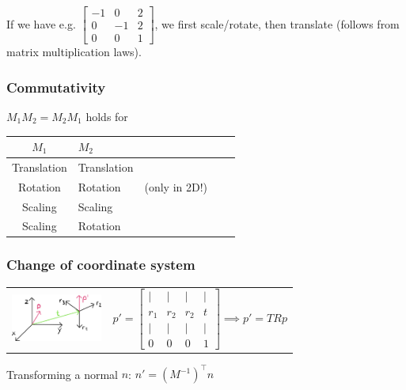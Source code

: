 \documentclass[a4paper,10pt]{article}
\renewcommand*{\arraystretch}{2}
\begin{document}
\egroup
If we have e.g. \(  \left[\begin{smallmatrix} -1 & 0 & 2 \\ 0 & -1 & 2 \\ 0 & 0 & 1 \end{smallmatrix}\right] \), we first scale/rotate, then translate (follows from matrix multiplication laws).

\subsubsection{Commutativity}
\( M_1 M_{2} = M_{2} M_{1} \) holds for
\begin{center}
    {\renewcommand{\arraystretch}{1.2}
    \begin{tabularx}{\linewidth}{c>{\centering\arraybackslash}Xc>{\centering\arraybackslash}Xc}
	\toprule
	\( M_{1} \) & \( M_{2} \) & \\
	\midrule
	Translation & Translation & \\
	Rotation & Rotation & (only in 2D!) \\
	Scaling & Scaling &\\
	Scaling & Rotation & \\
	\bottomrule
    \end{tabularx}
    }
\end{center}

\subsubsection{Change of coordinate system} \hfill \break
\begin{tabular}{m{3cm}r}
    \includegraphics[width=3cm]{coord-system-change.jpeg}
&
$
 p' = \left[\begin{smallmatrix} | & | & | & | \\ r_1 & r_2 & r_2 & t \\ | & | & | & | \\ 0 & 0 & 0 & 1 \end{smallmatrix}\right] \implies p' = TRp
$
\\
\end{tabular}

Transforming a normal \( n \): \( n' = (M^{-1})^\top n \)
\end{document}
